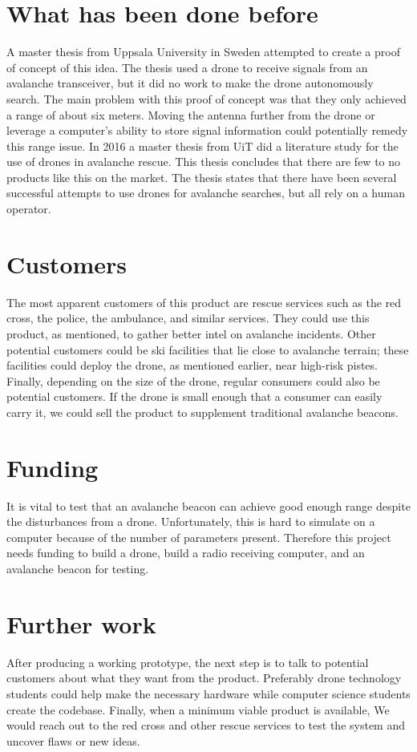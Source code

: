 \documentclass{article}
\begin{document}
\section*{What has been done before}
A master thesis from Uppsala University in Sweden attempted to create a proof of concept of this idea\cite{uppsala}. The thesis used a drone to receive signals from an avalanche transceiver, but it did no work to make the drone autonomously search. The main problem with this proof of concept was that they only achieved a range of about six meters. Moving the antenna further from the drone or leverage a computer's ability to store signal information could potentially remedy this range issue. In 2016 a master thesis from UiT did a literature study for the use of drones in avalanche rescue\cite{litstudy}. This thesis concludes that there are few to no products like this on the market. The thesis states that there have been several successful attempts to use drones for avalanche searches, but all rely on a human operator.

\section*{Customers}
The most apparent customers of this product are rescue services such as the red cross, the police, the ambulance, and similar services. They could use this product, as mentioned, to gather better intel on avalanche incidents. Other potential customers could be ski facilities that lie close to avalanche terrain; these facilities could deploy the drone, as mentioned earlier, near high-risk pistes. Finally, depending on the size of the drone, regular consumers could also be potential customers. If the drone is small enough that a consumer can easily carry it, we could sell the product to supplement traditional avalanche beacons.

\section*{Funding}
It is vital to test that an avalanche beacon can achieve good enough range despite the disturbances from a drone. Unfortunately, this is hard to simulate on a computer because of the number of parameters present. Therefore this project needs funding to build a drone, build a radio receiving computer, and an avalanche beacon for testing.

\section*{Further work}
After producing a working prototype, the next step is to talk to potential customers about what they want from the product. Preferably drone technology students could help make the necessary hardware while computer science students create the codebase. Finally, when a minimum viable product is available, We would reach out to the red cross and other rescue services to test the system and uncover flaws or new ideas. 
\end{document}
